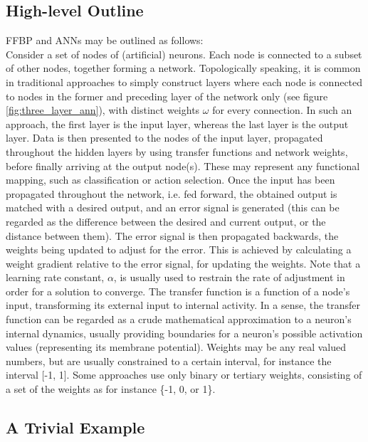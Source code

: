 \subsection{High-level Outline}
FFBP and ANNs may be outlined as follows:
\\
Consider a set of nodes of (artificial) neurons. Each node is connected to a subset of other nodes, together forming a network. Topologically speaking, it is common in traditional approaches to simply construct layers where each node is connected to nodes in the former and preceding layer of the network only (see figure \ref{fig:three_layer_ann}), with distinct weights $\omega$ for every connection. In such an approach, the first layer is the input layer, whereas the last layer is the output layer. Data is then presented to the nodes of the input layer, propagated throughout the hidden layers by using transfer functions and network weights, before finally arriving at the output node(s). These may represent any functional mapping, such as classification or action selection. Once the input has been propagated throughout the network, i.e. fed forward, the obtained output is matched with a desired output, and an error signal is generated (this can be regarded as the difference between the desired and current output, or the distance between them). The error signal is then propagated backwards, the weights being updated to adjust for the error. This is achieved by calculating a weight gradient relative to the error signal, for updating the weights. Note that a learning rate constant, $\alpha$, is usually used to restrain the rate of adjustment in order for a solution to converge.
The transfer function is a function of a node's input, transforming its external input to internal activity. In a sense, the transfer function can be regarded as a crude mathematical approximation to a neuron's internal dynamics, usually providing boundaries for a neuron's possible activation values (representing its membrane potential). Weights may be any real valued numbers, but are usually constrained to a certain interval, for instance the interval [-1, 1]. Some approaches use only binary or tertiary weights, consisting of a set of the weights as for instance \{-1, 0, or 1\}.

\subsection{A Trivial Example}\label{trivial_example}

